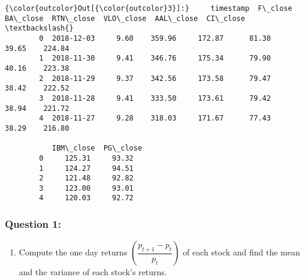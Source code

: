 \documentclass[11pt]{article}
\providecommand{\tightlist}{%
      \setlength{\itemsep}{0pt}\setlength{\parskip}{0pt}}
\begin{document}
\begin{Verbatim}[commandchars=\\\{\}]
{\color{outcolor}Out[{\color{outcolor}3}]:}     timestamp  F\_close  BA\_close  RTN\_close  VLO\_close  AAL\_close  CI\_close  \textbackslash{}
        0  2018-12-03     9.60    359.96     172.87      81.30      39.65    224.84   
        1  2018-11-30     9.41    346.76     175.34      79.90      40.16    223.38   
        2  2018-11-29     9.37    342.56     173.58      79.47      38.42    222.52   
        3  2018-11-28     9.41    333.50     173.61      79.42      38.94    221.72   
        4  2018-11-27     9.28    318.03     171.67      77.43      38.29    216.80   
        
           IBM\_close  PG\_close  
        0     125.31     93.32  
        1     124.27     94.51  
        2     121.48     92.82  
        3     123.00     93.01  
        4     120.03     92.72  
\end{Verbatim}
            
    \hypertarget{question-1}{%
\subsubsection{Question 1:}\label{question-1}}

\begin{enumerate}
\def\labelenumi{(\alph{enumi})}
\tightlist
\item
  Compute the one day returns
  \(\left (\dfrac{p_{t+1}-p_{t}}{p_{t}} \right )\) of each stock and
  find the mean and the variance of each stock's returns.
\end{enumerate}
\end{document}
